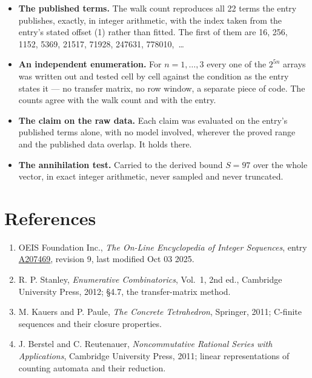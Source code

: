 \documentclass[11pt]{article}
\theoremstyle{definition}
\begin{document}
\begin{itemize}

\item {\bfseries The published terms.} The walk count reproduces all 22 terms the entry publishes, exactly, in integer arithmetic, with the index taken from the entry's stated offset (1) rather than fitted. The first of them are 16, 256, 1152, 5369, 21517, 71928, 247631, 778010,~\dots

\item {\bfseries An independent enumeration.} For $n = 1,\dots,3$ every one of the $2^{5n}$ arrays was written out and tested cell by cell against the condition as the entry states it --- no transfer matrix, no row window, a separate piece of code. The counts agree with the walk count and with the entry.

\item {\bfseries The claim on the raw data.} Each claim was evaluated on the entry's published terms alone, with no model involved, wherever the proved range and the published data overlap. It holds there.

\item {\bfseries The annihilation test.} Carried to the derived bound $S = 97$ over the whole vector, in exact integer arithmetic, never sampled and never truncated.

\end{itemize}

\section{References}

\begin{enumerate}

\item OEIS Foundation Inc., \emph{The On-Line Encyclopedia of Integer Sequences}, entry \href{https://oeis.org/A207469}{A207469}, revision 9, last modified Oct 03 2025.

\item R. P. Stanley, \emph{Enumerative Combinatorics}, Vol.~1, 2nd ed., Cambridge University Press, 2012; \S4.7, the transfer-matrix method.

\item M. Kauers and P. Paule, \emph{The Concrete Tetrahedron}, Springer, 2011; C-finite sequences and their closure properties.

\item J. Berstel and C. Reutenauer, \emph{Noncommutative Rational Series with Applications}, Cambridge University Press, 2011; linear representations of counting automata and their reduction.

\end{enumerate}
\end{document}
